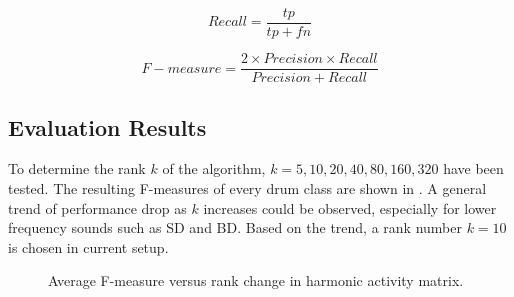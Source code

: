 \documentclass{article}
\begin{document}
\begin{equation}
Recall = \frac{tp}{tp + fn}
\label{eq:recall}
\end{equation}

\begin{equation}
F-measure = \frac{2 \times Precision \times Recall}{Precision + Recall}
\label{eq:Fmeasure}
\end{equation}
  



\subsection{Evaluation Results}\label{subsec:evaluation results}

To determine the rank $k$ of the algorithm, $k = {5, 10, 20, 40, 80, 160, 320}$ have been tested. The resulting F-measures of every drum class are shown in . A general trend of performance drop as $k$ increases could be observed, especially for lower frequency sounds such as SD and BD. Based on the trend, a rank number $k = 10$ is chosen in current setup. 

\begin{figure}
 \centerline{}
 \caption{Average F-measure versus rank change in harmonic activity matrix.}
 \label{fig:rankTest}
\end{figure}
\end{document}
